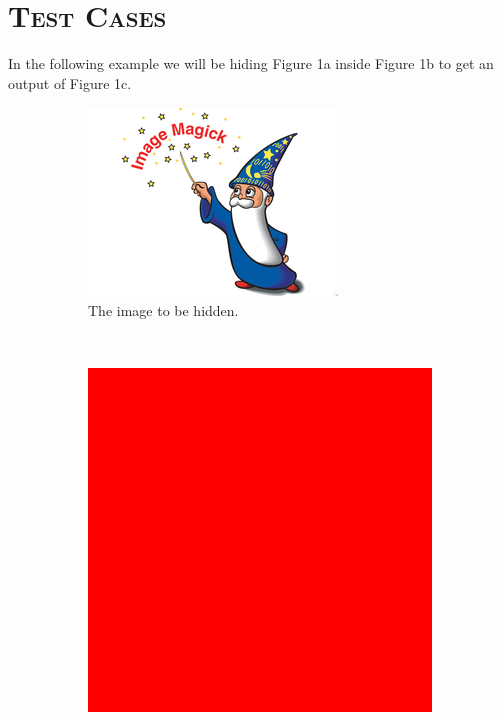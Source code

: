 \documentclass[12pt]{article}
\begin{document}
	\section[Test Cases]{\Large{}\selectfont\scshape Test Cases}
	
	In the following example we will be hiding Figure 1a inside Figure 1b to get an output of Figure 1c.
	\begin{figure}[h]
		\centering
		\begin{subfigure}[t]{0.3\textwidth}
			\includegraphics[width=\textwidth]{image/littleWizzard.png}
			\caption{The image to be hidden.}
		\end{subfigure}
		~
		\begin{subfigure}[t]{0.3\textwidth}
			\includegraphics[width=\textwidth]{image/red.png}

\end{subfigure}
\end{figure}
\end{document}
